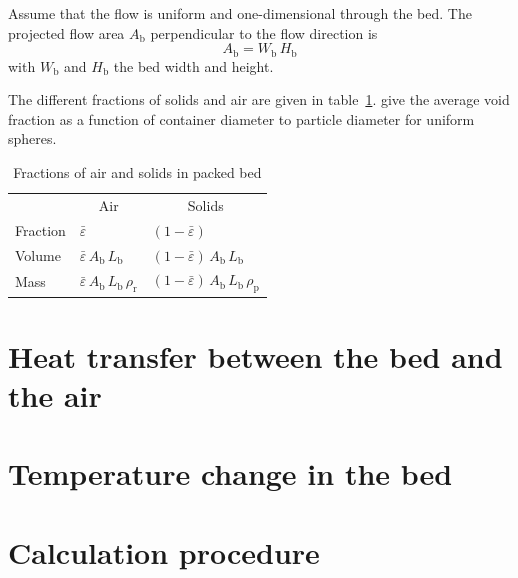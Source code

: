\documentclass[12pt,a4paper]{article}
\newcommand\vf{\bar{\varepsilon}}    %
\newcommand\usubi[2]{_{{\mathrm{#1}}{#2}}}
\newcommand\bed[1][]{\usubi{b}{#1}}  %
\newcommand\elm[1][]{\usubi{p}{#1}}  %
\newcommand\hs[1][]{\usubi{r}{#1}}   %
\begin{document}
Assume that the flow is uniform and one-dimensional through the bed. The projected
flow area $A\bed$ perpendicular to the flow direction is
\begin{equation}
    A\bed = W\bed\,H\bed
\end{equation}
with $W\bed$ and $H\bed$ the bed width and height.

The different fractions of solids and air are given in table~\ref{tab:bed-prop}. 
 give the average void fraction as a function of container diameter to particle diameter for uniform spheres. 

\begin{table}[htbp]
    \centering
    \caption{Fractions of air and solids in packed bed}
    \label{tab:bed-prop}
    \begin{tabular}{@{}lll@{}}
        \toprule
                 & \multicolumn{1}{c}{Air}     & \multicolumn{1}{c}{Solids}      \\
        \cmidrule(lr){2-2}\cmidrule(l){3-3}
        Fraction & $\vf$                       & $(1-\vf)$                        \\
        Volume   & $\vf\, A\bed\, L\bed$           & $(1-\vf)\, A\bed\, L\bed$            \\
        Mass     & $\vf\, A\bed\, L\bed\,\rho\hs$ & $(1-\vf)\, A\bed\, L\bed\, \rho\elm$ \\
        \bottomrule
    \end{tabular}
\end{table}


\section{Heat transfer between the bed and the air}

\section{Temperature change in the bed}

\section{Calculation procedure}



\end{document}
